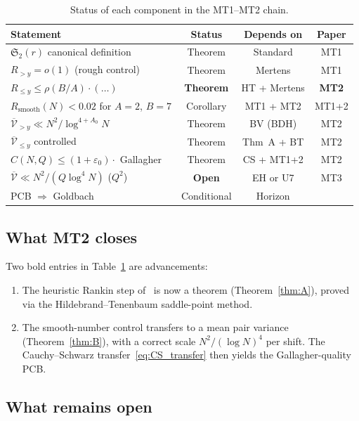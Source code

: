 \documentclass[11pt,reqno]{amsart}
\theoremstyle{plain}
\theoremstyle{definition}
\theoremstyle{remark}
\newcommand{\Rsmooth}{R_{\mathrm{smooth}}}
\newcommand{\Sfrak}{\mathfrak{S}_2}
\newcommand{\eps}{\varepsilon}
\begin{document}
\begin{table}[h]
\centering
\caption{Status of each component in the MT1--MT2 chain.}
\label{tab:ledger}
\smallskip
\renewcommand{\arraystretch}{1.15}
\begin{tabular}{@{}p{5.8cm}ccc@{}}
\toprule
\textbf{Statement} & \textbf{Status} & \textbf{Depends on} & \textbf{Paper} \\
\midrule
$\Sfrak(r)$ canonical definition & Theorem & Standard & MT1 \\
$R_{>y} = o(1)$ (rough control) & Theorem & Mertens & MT1 \\
$R_{\le y} \le \rho(B/A) \cdot (\ldots)$ & \textbf{Theorem} & HT + Mertens & \textbf{MT2} \\
$\Rsmooth(N) < 0.02$ for $A{=}2$, $B{=}7$ & Corollary & MT1 + MT2 & MT1+2 \\
$\overline{\mathcal{V}}_{>y} \ll N^2/\log^{4+A_0} N$ & Theorem & BV (BDH) & MT2 \\
$\overline{\mathcal{V}}_{\le y}$ controlled & Theorem & Thm~A + BT & MT2 \\
$C(N,Q) \le (1{+}\eps_0) \cdot$ Gallagher & Theorem & CS + MT1+2 & MT2 \\
$\overline{\mathcal{V}} \ll N^2/(Q\log^4 N)$ ($Q^2$) & \textbf{Open} & EH or U7 & MT3 \\
PCB $\Rightarrow$ Goldbach & Conditional & Horizon & \cite{G36} \\
\bottomrule
\end{tabular}
\end{table}

\subsection{What MT2 closes}

Two bold entries in Table~\ref{tab:ledger} are advancements:
\begin{enumerate}[nosep]
  \item The heuristic Rankin step of~\cite{MT1} is now a theorem
    (Theorem~\ref{thm:A}), proved via the Hildebrand--Tenenbaum
    saddle-point method.
  \item The smooth-number control transfers to a mean pair variance
    (Theorem~\ref{thm:B}), with a correct scale $N^2/(\log N)^4$
    per shift. The Cauchy--Schwarz transfer~\eqref{eq:CS_transfer}
    then yields the Gallagher-quality PCB.
\end{enumerate}

\subsection{What remains open}
\end{document}
